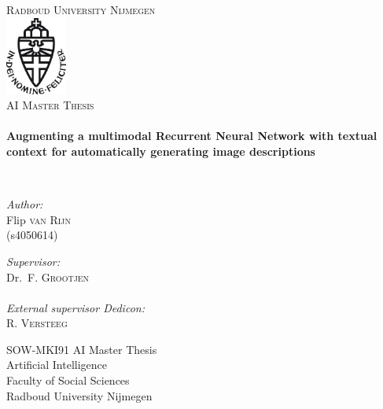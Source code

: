 \begin{titlepage}
\begin{center}

\textsc{\LARGE Radboud University Nijmegen}\\[1.5cm]

\includegraphics[width=0.15\textwidth]{images/ru-logo}~\\[1cm]

\textsc{\Large AI Master Thesis}\\[0.5cm]

\HRule \\[0.4cm]
{ \huge \bfseries Augmenting a multimodal Recurrent Neural Network  with textual context for automatically generating image descriptions \\[0.4cm] }

\HRule \\[1.5cm]

\begin{minipage}{0.4\textwidth}
\begin{flushleft} \large
\emph{Author:}\\
Flip \textsc{van Rijn} \\
(s4050614)
\end{flushleft}
\end{minipage}
\begin{minipage}{0.4\textwidth}
\begin{flushright} \large
\emph{Supervisor:} \\
Dr.~F. \textsc{Grootjen} \\
~\\
\emph{External supervisor Dedicon:} \\
R. \textsc{Versteeg}\\
\end{flushright}
\end{minipage}

\vfill

SOW-MKI91 AI Master Thesis\\
Artificial Intelligence\\
Faculty of Social Sciences\\
Radboud University Nijmegen\\
{\large \date{}}

\end{center}
\end{titlepage}